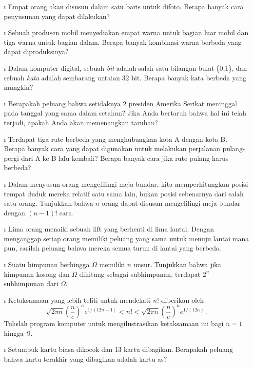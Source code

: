 \exercises
\begin{LJSItem}

\i\label{exer 3.1.1} Empat orang akan disusun dalam satu baris untuk difoto.  Berapa
banyak cara penyusunan yang dapat dilakukan?

\i\label{exer 3.1.2} Sebuah produsen mobil menyediakan empat warna untuk bagian luar
mobil dan tiga warna untuk bagian dalam.  Berapa banyak kombinasi warna berbeda yang
dapat diproduksinya?

\i\label{exer 3.1.3} Dalam komputer digital, sebuah {\em bit} adalah salah satu bilangan
bulat \{0,1\}, dan sebuah {\em kata} adalah sembarang untaian 32 bit.  Berapa banyak
kata berbeda yang mungkin?

\i\label{exer 3.1.4} Berapakah peluang bahwa setidaknya 2 presiden Amerika Serikat
meninggal pada tanggal yang sama dalam setahun?  Jika Anda bertaruh bahwa hal ini telah
terjadi, apakah Anda akan memenangkan taruhan?

\i\label{exer 3.1.5} Terdapat tiga rute berbeda yang menghubungkan kota A dengan kota B.
Berapa banyak cara yang dapat digunakan untuk melakukan perjalanan pulang-pergi dari A
ke B lalu kembali?
Berapa banyak cara jika rute pulang harus berbeda?

\i\label{exer 3.1.6} Dalam menyusun orang mengelilingi meja bundar, kita memperhitungkan
posisi tempat duduk mereka relatif satu sama lain, bukan posisi sebenarnya dari salah
satu orang.  Tunjukkan bahwa $n$ orang dapat disusun mengelilingi meja bundar dengan
$(n - 1)!$ cara.

\i\label{exer 3.1.7} Lima orang menaiki sebuah lift yang berhenti di lima
lantai.  Dengan menganggap setiap orang memiliki peluang yang sama untuk menuju lantai
mana pun, carilah peluang bahwa mereka semua turun di lantai yang berbeda.

\i\label{exer 3.1.8} Suatu himpunan berhingga $\Omega$ memiliki $n$ unsur.  Tunjukkan
bahwa jika himpunan kosong dan $\Omega$ dihitung sebagai subhimpunan, terdapat $2^n$
subhimpunan dari $\Omega$.

\i\label{exer 3.1.9} Ketaksamaan yang lebih teliti untuk mendekati $n!$ diberikan oleh
$$
\sqrt{2\pi n}\left(\frac ne\right)^n e^{1/(12n + 1)} < n! < \sqrt{2\pi n}\left(\frac
ne\right)^n e^{1/(12n)}\ .
$$ Tulislah program komputer untuk mengilustrasikan ketaksamaan ini bagi $n = 1$ hingga~9.

\i\label{exer 3.1.10} Setumpuk kartu biasa dikocok dan 13 kartu dibagikan.  Berapakah
peluang bahwa kartu terakhir yang dibagikan adalah kartu as?


\end{LJSItem}
